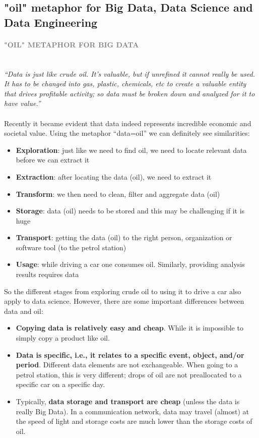 \documentclass[10pt,a4paper]{article}
\newcommand{\nline}{\\~\\}
\newcommand{\myparagraph}[1]{\paragraph{\normalsize{\textcolor{gray}{\uppercase{\textbf{#1}}}} }\mbox{} \vspace{0.5em}\\}
\begin{document}
\subsection{"oil" metaphor for Big Data, Data Science and Data Engineering}
\myparagraph{"oil" metaphor for Big Data}
\textit{“Data is just like crude oil. It’s valuable, but if unrefined it cannot really be used. It has to be changed into gas, plastic, chemicals, etc to create a valuable entity that drives profitable activity; so data must be broken down and analyzed for it to have value.”}
\nline
Recently it became evident that data indeed represents incredible economic and societal value. Using the metaphor “data=oil” we can definitely see similarities:
\begin{itemize}
	\item \textbf{Exploration}: just like we need to find oil, we need to locate relevant data before we can extract it
	\item \textbf{Extraction}: after locating the data (oil), we need to extract it
	\item \textbf{Transform}: we then need to clean, filter and aggregate data (oil)
	\item \textbf{Storage}: data (oil) needs to be stored and this may be challenging if it is huge
	\item \textbf{Transport}: getting the data (oil) to the right person, organization or software tool (to the petrol station)
	\item \textbf{Usage}: while driving a car one consumes oil. Similarly, providing analysis results requires data
\end{itemize}
So the different stages from exploring crude oil to using it to drive a car also apply to data science. However, there are some important differences between data and oil:
\begin{itemize}
	\item \textbf{Copying data is relatively easy and cheap}. While it is impossible to simply copy a product like oil.
	\item \textbf{Data is specific, i.e., it relates to a specific event, object, and/or period}. Different data elements are not exchangeable. When going to a petrol station, this is very different; drops of oil are not preallocated to a specific car on a specific day.
	\item Typically, \textbf{data storage and transport are cheap} (unless the data is really Big Data). In a communication network, data may travel (almost) at the speed of light and storage costs are much lower than the storage costs of oil.
\end{itemize}
\end{document}
